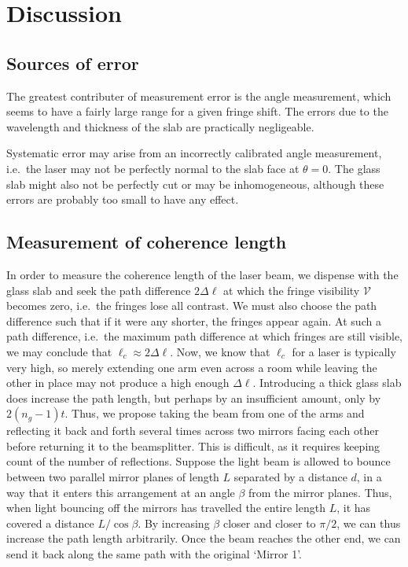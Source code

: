 \documentclass[11pt]{article}
\begin{document}
        \section{Discussion}
        
        \subsection{Sources of error}
        The greatest contributer of measurement error is the angle measurement, which seems to have a fairly large range for a given fringe shift.
        The errors due to the wavelength and thickness of the slab are practically negligeable.

        Systematic error may arise from an incorrectly calibrated angle measurement, i.e.\ the laser may not be perfectly normal to the 
        slab face at $\theta = 0$. The glass slab might also not be perfectly cut or may be inhomogeneous, although these errors are probably 
        too small to have any effect.
        
        \subsection{Measurement of coherence length}
        In order to measure the coherence length of the laser beam, we dispense with the glass slab and seek the path difference $2\Delta\ell$
        at which the fringe visibility $\mathcal{V}$ becomes zero, i.e.\ the fringes lose all contrast. We must also choose the path
        difference such that if it were any shorter, the fringes appear again.
        At such a path difference, i.e.\ the maximum path difference at which fringes are still visible, we may conclude that $\ell_c \approx 2\Delta\ell$.
        Now, we know that $\ell_c$ for a laser is typically very high, so merely extending one arm even across a room while leaving the other 
        in place may not produce a high enough $\Delta\ell$. 
        Introducing a thick glass slab does increase the path length, but perhaps by an insufficient amount, only by $2(n_g - 1)t$.
        Thus, we propose taking the beam from one of the arms and reflecting it back and forth several times across two mirrors facing each other 
        before returning it to the beamsplitter. This is difficult, as it requires keeping count of the number of reflections.
        Suppose the light beam is allowed to bounce between two parallel mirror planes of length $L$ separated by a distance $d$, 
        in a way that it enters this arrangement at an angle $\beta$ from the mirror planes.
        Thus, when light bouncing off the mirrors has travelled the entire length $L$, it has covered a distance $L /\cos\beta$.
        By increasing $\beta$ closer and closer to $\pi /2$, we can thus increase the path length arbitrarily. Once the beam reaches the other
        end, we can send it back along the same path with the original `Mirror 1'.
\end{document}
